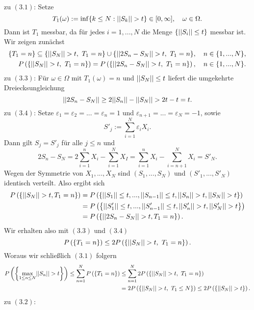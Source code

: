 \begin{proof*}
    zu $(3.1)$:
    Setze 
    $$
        T_1(\omega) := \inf\{ k \leq N: \lvert\lvert S_k \rvert\rvert > t \} \in [0, \infty], \quad \omega \in \Omega. 
    $$
    Dann ist $T_1$ messbar, da für jedes $i =1,...,N$ die Menge $\{ \lvert\lvert S_i \rvert\rvert \leq t\}$ messbar ist. 
    Wir zeigen zunächst
    \begin{align}
        \{T_1 = n\} \subseteq \{\lvert\lvert S_N \rvert\rvert > t,\  T_1 = n\} \cup \{\lvert\lvert 2S_n - S_N \rvert\rvert>t,\  T_1=n\}, \quad n \in \{1,...,N\}, \\\
        P\left(\left\{ \lvert\lvert S_N \rvert\rvert > t, \ T_1=n \right\}\right) = P\left(\left\{ \lvert\lvert 2S_n - S_N \rvert\rvert > t,\  T_1=n \right\}\right), \quad n \in \{1,...,N\}. 
    \end{align}
    zu $(3.3)$:
    Für $\omega \in \Omega$ mit $T_1(\omega) = n$ und $\lvert\lvert S_N \rvert\rvert \leq t$ liefert die umgekehrte Dreiecksungleichung
    $$
        \lvert\lvert 2S_n - S_N \rvert\rvert \geq 2\lvert\lvert S_n \rvert\rvert - \lvert\lvert S_N \rvert\rvert > 2t - t = t. 
    $$
    zu $(3.4)$: Setze $\varepsilon_1 = \varepsilon_2 = ... = \varepsilon_n = 1$ und $\varepsilon_{n+1} = ... = \varepsilon_N = -1$, sowie
    $$
        S'_j := \sum_{i=1}^N\varepsilon_i X_i. 
    $$
    Dann gilt $S_j = S'_j$ für alle $j \leq n$ und 
    $$
        2S_n - S_N = 2 \sum_{i=1}^n X_i - \sum_{i=1}^N X_I = \sum_{i=1}^nX_i - \sum_{i=n+1}^N X_i = S'_N. 
    $$
    Wegen der Symmetrie von $X_1,...,X_N$ sind $(S_1,...,S_N)$ und $(S'_1,...,S'_N)$ identisch verteilt. Also ergibt sich 
    \begin{align*}
        P\left(\left\{ \lvert\lvert S_N \rvert\rvert > t, T_1=n \right\}\right) &= P\left(\left\{ \lvert\lvert S_1 \rvert\rvert \leq t,...,\lvert\lvert S_{n-1} \rvert\rvert\leq t, \lvert\lvert S_n \rvert\rvert > t, \lvert\lvert S_N \rvert\rvert > t \right\}\right) \\\
                                   &= P\left(\left\{ \lvert\lvert S'_1 \rvert\rvert\leq t,...,\lvert\lvert S'_{n-1} \rvert\rvert\leq t, \lvert\lvert S'_n \rvert\rvert > t, \lvert\lvert S'_N \rvert\rvert > t \right\}\right) \\\
                                   &= P\left(\left\{ \lvert\lvert 2S_n - S_N \rvert\rvert > t, T_1=n \right\}\right). 
    \end{align*}
    Wir erhalten also mit $(3.3)$ und $(3.4)$ 
    $$
        P\left(\left\{ T_1=n \right\}\right) \leq 2 P\left(\left\{ \lvert\lvert S_N \rvert\rvert > t, \ T_1=n \right\}\right).
    $$
    Woraus wir schließlich $(3.1)$ folgern  
    \begin{align*}
        P\left(\left\{ \max_{1 \leq n \leq N} \lvert\lvert S_n \rvert\rvert > t \right\}\right) \leq \sum_{n=1}^{N} P\left(\left\{ T_1=n \right\}\right) 
                                                     &\leq \sum_{n=1}^N2P\left(\left\{ \lvert\lvert S_N \rvert\rvert >t, \ T_1=n \right\}\right) \\\
                                                     &= 2 P\left(\left\{ \lvert\lvert S_N \rvert\rvert>t, \ T_1 \leq N \right\}\right) \leq 2 P\left(\left\{ \lvert\lvert S_N \rvert\rvert > t \right\}\right). 
    \end{align*}
    zu $(3.2)$: 

\end{proof*}

